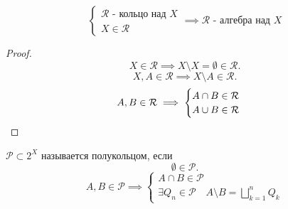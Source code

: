 \begin{lemma} \thmslashn

    \begin{equation*}
        \begin{cases}
            \mathcal{R} \text{ - кольцо над $X$}\\
            X\in \mathcal{R}
        \end{cases} \implies \mathcal{R} \text{ - алгебра над $X$}
    \end{equation*}
    \begin{proof} \thmslashn
    
        \[ X\in \mathcal{R} \implies X \setminus X = \emptyset\in \mathcal{R} .\]
        \[ X, A\in \mathcal{R} \implies X \setminus A\in \mathcal{R} .\]
        \begin{equation*}
            A, B\in \mathcal{R} \implies
            \begin{cases}
                A\cap B\in \mathcal{R}\\
                A \cup B\in \mathcal{R}
            \end{cases} \qedhere
        \end{equation*}
    \end{proof}
\end{lemma}
\begin{definition}[Полукольцо] \thmslashn 

    $\mathcal{P} \subset 2^{X}$ называется полукольцом, если
    \[ \emptyset\in \mathcal{P} .\]
    \begin{equation*}
        A, B\in \mathcal{P} \implies
        \begin{cases}
            A\cap B\in \mathcal{P}\\
            \exists{Q_{n}\in \mathcal{P}}\quad A \setminus B = \bigsqcup\limits_{k=1}^{n} Q_{k}
        \end{cases}
    \end{equation*}
\end{definition}
